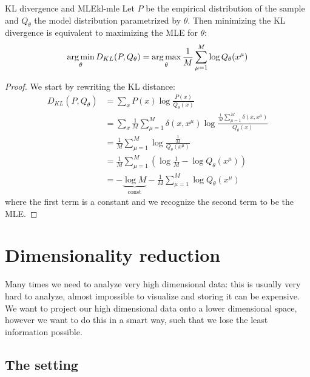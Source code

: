 \documentclass[12pt]{extarticle}
\begin{document}
\begin{proposition}{KL divergence and MLE}{kl-mle}
	Let $P$ be the empirical distribution of the sample and $Q_\theta$ the model distribution
	parametrized by $\theta$.
	Then minimizing the KL divergence is equivalent to maximizing the MLE for $\theta$:
	\begin{equation}
		\operatorname*{arg\,min}_\theta D_{KL}(P, Q_\theta) = \operatorname*{arg\,max}_\theta \frac{1}{M} \sum^M_{\mu = 1} \log
		Q_\theta(x^\mu)
	\end{equation}
\end{proposition}
\begin{proof}
	We start by rewriting the KL distance:
	\begin{align}
		D_{KL}(P, Q_\theta) & = \sum_x P(x) \log \frac{P(x)}{Q_\theta(x)}                                                                                   \\
		                    & = \sum_x \frac{1}{M} \sum^M_{\mu = 1} \delta(x, x^\mu) \log \frac{\frac{1}{M} \sum^M_{\mu = 1} \delta(x, x^\mu)}{Q_\theta(x)} \\
		                    & = \frac{1}{M} \sum^M_{\mu = 1} \log \frac{\frac{1}{M}}{Q_\theta(x^\mu)}                                                       \\
		                    & = \frac{1}{M} \sum^M_{\mu = 1}\left( \log \frac{1}{M} - \log Q_\theta(x^\mu) \right)                                          \\
		                    & = -\underbrace{\log M}_\text{const} - \frac{1}{M} \sum^M_{\mu = 1} \log Q_\theta(x^\mu)
	\end{align}
	where the first term is a constant and we recognize the second term to be the MLE.
\end{proof}

\section{Dimensionality reduction}

Many times we need to analyze very high dimensional data: this is usually very hard to analyze,
almost impossible to visualize and storing it can be expensive.
We want to project our high dimensional data onto a lower dimensional space, however we want to do
this in a smart way, such that we lose the least information possible.

\subsection{The setting}
\end{document}
